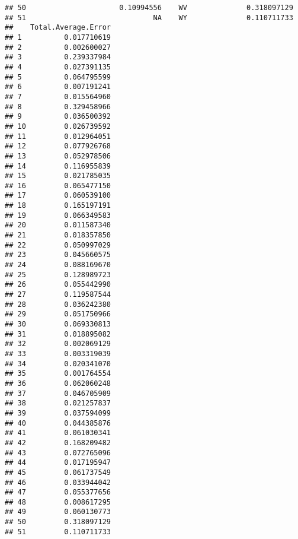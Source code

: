 \documentclass{article}\usepackage[]{graphicx}\usepackage[]{color}
\makeatletter
\newenvironment{kframe}{%
 \def\at@end@of@kframe{}%
 \ifinner\ifhmode%
  \def\at@end@of@kframe{\end{minipage}}%
  \begin{minipage}{\columnwidth}%
 \fi\fi%
 \def\FrameCommand##1{\hskip\@totalleftmargin \hskip-\fboxsep
 \colorbox{shadecolor}{##1}\hskip-\fboxsep
     \hskip-\linewidth \hskip-\@totalleftmargin \hskip\columnwidth}%
 \MakeFramed {\advance\hsize-\width
   \@totalleftmargin\z@ \linewidth\hsize
   \@setminipage}}%
 {\par\unskip\endMakeFramed%
 \at@end@of@kframe}
\newenvironment{knitrout}{}{} %
\makeatother
\begin{document}
\begin{knitrout}
\begin{kframe}
\begin{verbatim}
## 50                      0.10994556    WV              0.318097129
## 51                              NA    WY              0.110711733
##    Total.Average.Error
## 1          0.017710619
## 2          0.002600027
## 3          0.239337984
## 4          0.027391135
## 5          0.064795599
## 6          0.007191241
## 7          0.015564960
## 8          0.329458966
## 9          0.036500392
## 10         0.026739592
## 11         0.012964051
## 12         0.077926768
## 13         0.052978506
## 14         0.116955839
## 15         0.021785035
## 16         0.065477150
## 17         0.060539100
## 18         0.165197191
## 19         0.066349583
## 20         0.011587340
## 21         0.018357850
## 22         0.050997029
## 23         0.045660575
## 24         0.088169670
## 25         0.128989723
## 26         0.055442990
## 27         0.119587544
## 28         0.036242380
## 29         0.051750966
## 30         0.069330813
## 31         0.018895082
## 32         0.002069129
## 33         0.003319039
## 34         0.020341070
## 35         0.001764554
## 36         0.062060248
## 37         0.046705909
## 38         0.021257837
## 39         0.037594099
## 40         0.044385876
## 41         0.061030341
## 42         0.168209482
## 43         0.072765096
## 44         0.017195947
## 45         0.061737549
## 46         0.033944042
## 47         0.055377656
## 48         0.008617295
## 49         0.060130773
## 50         0.318097129
## 51         0.110711733
\end{verbatim}
\end{kframe}
\end{knitrout}
\end{document}

